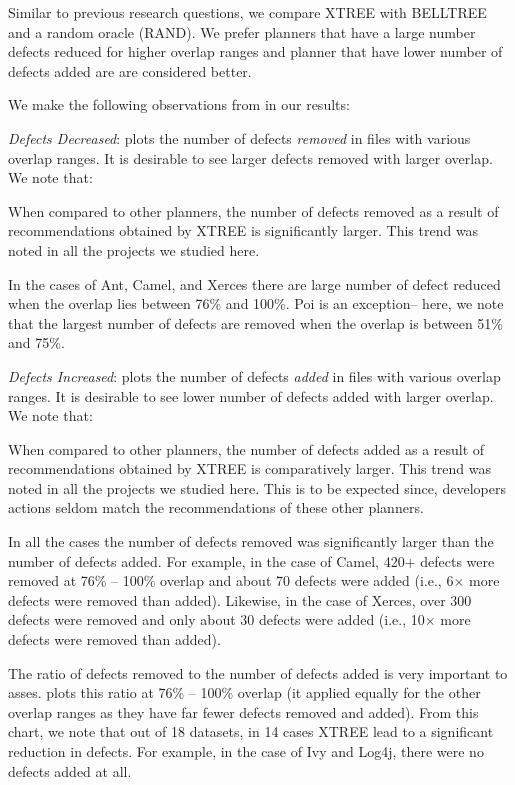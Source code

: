 Similar to previous research questions, we compare XTREE with BELLTREE and a random oracle (RAND). We prefer planners that have a large number defects reduced for higher overlap ranges and planner that have lower number of defects added are are considered better.

We make the following observations from in our results: 
\be
\item \textit{Defects Decreased}: \protect{} plots the number of defects \textit{removed} in files with various overlap ranges. It is desirable to see larger defects removed with larger overlap. We note that:
\bi
\item When compared to other planners, the number of defects removed as a result of recommendations obtained by XTREE is significantly larger. This trend was noted in all the projects we studied here.
\item In the cases of Ant, Camel, and Xerces there are large number of defect reduced when the overlap lies between 76\% and 100\%. Poi is an exception-- here, we note that the largest number of defects are removed when the overlap is between 51\% and 75\%. 
\ei

\item \textit{Defects Increased}: \protect{} plots the number of defects \textit{added} in files with various overlap ranges. It is desirable to see lower number of defects added with larger overlap. We note that: 
\bi
\item When compared to other planners, the number of defects added as a result of recommendations obtained by XTREE is comparatively larger. This trend was noted in all the projects we studied here. This is to be expected since, developers actions seldom match the recommendations of these other planners. 

\item In all the cases the number of defects removed was significantly larger than the number of defects added. For example, in the case of Camel, 420+ defects were removed at 76\% -- 100\% overlap and about 70 defects were added (i.e., 6$\times$ more defects were removed than added). Likewise, in the case of Xerces, over 300 defects were removed and only about 30 defects were added (i.e., 10$\times$ more defects were removed than added).
\ei
\ee

The ratio of defects removed to the number of defects added is very important to asses.  plots this ratio at 76\% -- 100\% overlap (it applied equally for the other overlap ranges as they have far fewer defects removed and added). From this chart, we note that out of 18 datasets, in 14 cases XTREE lead to a significant reduction in defects. For example, in the case of Ivy and Log4j, there were no defects added at all.

